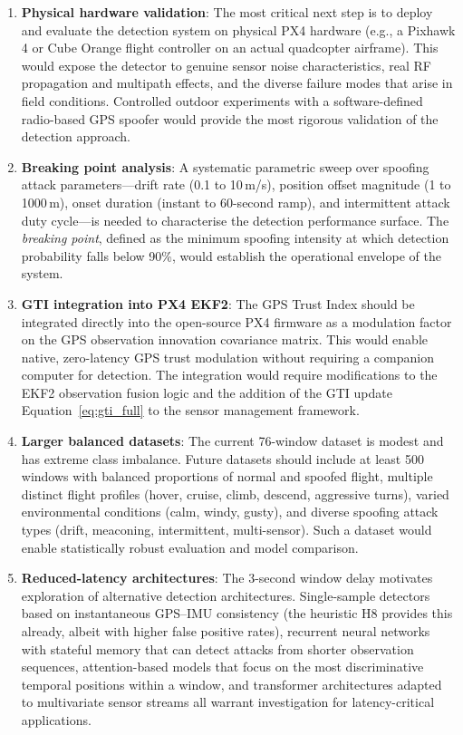 \begin{enumerate}
    \item \textbf{Physical hardware validation}: The most critical next step is to deploy and evaluate the detection system on physical PX4 hardware (e.g., a Pixhawk 4 or Cube Orange flight controller on an actual quadcopter airframe). This would expose the detector to genuine sensor noise characteristics, real RF propagation and multipath effects, and the diverse failure modes that arise in field conditions. Controlled outdoor experiments with a software-defined radio-based GPS spoofer would provide the most rigorous validation of the detection approach.
    \item \textbf{Breaking point analysis}: A systematic parametric sweep over spoofing attack parameters---drift rate (0.1 to 10\,m/s), position offset magnitude (1 to 1000\,m), onset duration (instant to 60-second ramp), and intermittent attack duty cycle---is needed to characterise the detection performance surface. The \textit{breaking point}, defined as the minimum spoofing intensity at which detection probability falls below 90\%, would establish the operational envelope of the system.
    \item \textbf{GTI integration into PX4 EKF2}: The GPS Trust Index should be integrated directly into the open-source PX4 firmware as a modulation factor on the GPS observation innovation covariance matrix. This would enable native, zero-latency GPS trust modulation without requiring a companion computer for detection. The integration would require modifications to the EKF2 observation fusion logic and the addition of the GTI update Equation~\ref{eq:gti_full} to the sensor management framework.
    \item \textbf{Larger balanced datasets}: The current 76-window dataset is modest and has extreme class imbalance. Future datasets should include at least 500 windows with balanced proportions of normal and spoofed flight, multiple distinct flight profiles (hover, cruise, climb, descend, aggressive turns), varied environmental conditions (calm, windy, gusty), and diverse spoofing attack types (drift, meaconing, intermittent, multi-sensor). Such a dataset would enable statistically robust evaluation and model comparison.
    \item \textbf{Reduced-latency architectures}: The 3-second window delay motivates exploration of alternative detection architectures. Single-sample detectors based on instantaneous GPS--IMU consistency (the heuristic H8 provides this already, albeit with higher false positive rates), recurrent neural networks with stateful memory that can detect attacks from shorter observation sequences, attention-based models that focus on the most discriminative temporal positions within a window, and transformer architectures adapted to multivariate sensor streams all warrant investigation for latency-critical applications.

\end{enumerate}
